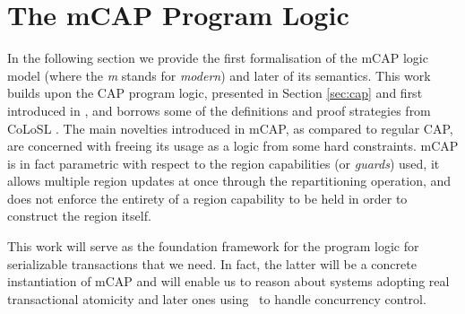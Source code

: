 \chapter{The mCAP Program Logic}

\label{sec:mcapModel}

In the following section we provide the first formalisation of the mCAP logic model (where the \textit{m} stands for \textit{modern}) and later of its semantics. This work builds upon the CAP program logic, presented in Section \ref{sec:cap} and first introduced in \cite{cap}, and borrows some of the definitions and proof strategies from CoLoSL \cite{colosl}. The main novelties introduced in mCAP, as compared to regular CAP, are concerned with freeing its usage as a logic from some hard constraints. mCAP is in fact parametric with respect to the region capabilities (or \textit{guards}) used, it allows multiple region updates at once through the repartitioning operation, and does not enforce the entirety of a region capability to be held in order to construct the region itself.

This work will serve as the foundation framework for the program logic for serializable transactions that we need. In fact, the latter will be a concrete instantiation of mCAP and will enable us to reason about systems adopting real transactional atomicity and later ones using \tpl\ to handle concurrency control.



\newpage



\newpage


